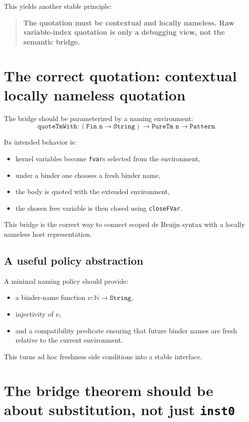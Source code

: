 \documentclass[11pt]{article}
\begin{document}
This yields another stable principle:

\begin{quote}
\textbf{The quotation must be contextual and locally nameless. Raw variable-index quotation is only a debugging view, not the semantic bridge.}
\end{quote}

\section{The correct quotation: contextual locally nameless quotation}

The bridge should be parameterized by a naming environment:
\[
\texttt{quoteTmWith} : (\texttt{Fin n} \to \texttt{String}) \to \texttt{PureTm n} \to \texttt{Pattern}.
\]

Its intended behavior is:
\begin{itemize}
  \item kernel variables become \texttt{fvar}s selected from the environment,
  \item under a binder one chooses a fresh binder name,
  \item the body is quoted with the extended environment,
  \item the chosen free variable is then closed using \texttt{closeFVar}.
\end{itemize}

This bridge is the correct way to connect scoped de Bruijn syntax with a locally nameless host representation.

\subsection{A useful policy abstraction}

A minimal naming policy should provide:
\begin{itemize}
  \item a binder-name function \(\nu : \mathbb{N} \to \texttt{String}\),
  \item injectivity of \(\nu\),
  \item and a compatibility predicate ensuring that future binder names are fresh relative to the current environment.
\end{itemize}

This turns ad hoc freshness side conditions into a stable interface.

\section{The bridge theorem should be about substitution, not just \texttt{inst0}}
\end{document}
